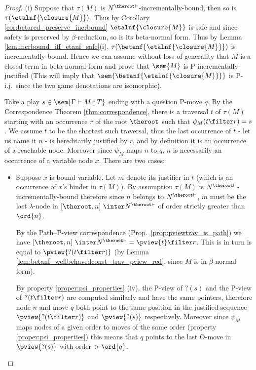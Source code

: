 \begin{proof}
\noindent (i) Suppose that $\tau(M)$ is
$N^{\theroot\vdash}$-incrementally-bound, then so is
$\tau(\etalnf{\closure{M}})$. Thus by Corollary
\ref{cor:betared_preserve_incrbound} $\etalnf{\closure{M}}$ is safe
and since safety is preserved by $\beta$-reduction, so is its
beta-normal form. Thus by Lemma
\ref{lem:incrbound_iff_etanf_safe}(i),
$\tau(\betanf{\etalnf{\closure{M}}})$ is incrementally-bound. Hence
we can assume without loss of generality that $M$ is a closed term
in beta-normal form and prove that $\sem{M}$ is
P-incrementally-justified (This will imply that
$\sem{\betanf{\etalnf{\closure{M}}}}$ is P-i.j.\ since the two game
denotations are isomorphic).

Take a play $s \in \sem{\Gamma \vdash M : T}$ ending with a question
P-move $q$. By the Correspondence Theorem \ref{thm:correspondence},
there is a traversal $t$ of $\tau(M)$ starting with an occurrence
$r$ of the root $\theroot$ such that $\psi_M (t\filter r) = s$. We
assume $t$ to be the shortest such traversal, thus the last
occurrence of $t$ - let us name it $n$ - is hereditarily justified
by $r$, and by definition it is an occurrence of a reachable node.
Moreover since $\psi_M$ maps $n$ to $q$, $n$ is necessarily an
occurrence of a variable node $x$. There are two cases:
\begin{itemize}
\item Suppose $x$ is bound variable. Let $m$ denote its justifier
in $t$ (which is an occurrence of $x$'s binder in $\tau(M)$). By
assumption $\tau(M)$ is $N^{\theroot\vdash}$-incrementally-bound
therefore since $n$ belongs to $N^{\theroot\vdash}$, $m$ must be
the last $\lambda$-node in $[\theroot,n]\ \inter
N^{\theroot\vdash}$ of order strictly greater than $\ord{n}$.

By the Path--P-view correspondence (Prop.\
\ref{prop:pviewtrav_is_path}) we have $[\theroot,n]\ \inter
N^{\theroot\vdash} = \pview{t} \filter r$. This is in turn is
equal to $\pview{?(t \filter r)}$ (by Lemma
\ref{lem:betanf_wellbehavedconst_trav_pview_red}, since $M$ is
in $\beta$-normal form).


By property \ref{proper:psi_properties} (iv), the P-view of
$?(s)$ and the P-view of $?(t \filter r)$ are computed similarly
and have the same pointers, therefore node $n$ and move $q$ both
point to the same position in the justified sequence
$\pview{?(t\filter r)}$ and $\pview{?(s)}$ respectively.
Moreover since $\psi_M$ maps nodes of a given order to moves of
the same order (property \ref{proper:psi_properties}) this means
that $q$ points to the last O-move in $\pview{?(s)}$ with order
$>\ord{q}$.


\end{itemize}
\end{proof}
